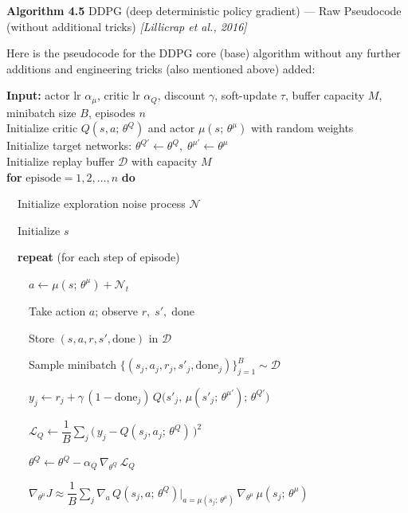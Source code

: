 \documentclass[11pt]{article}
\begin{document}
    \label{pseudo-4-5}

    \begin{pseudobox}

\textbf{Algorithm 4.5} DDPG (deep deterministic policy gradient) --- Raw
Pseudocode (without additional tricks) \emph{{[}Lillicrap et al.,
2016{]}}

\tcbline

Here is the pseudocode for the DDPG core (base) algorithm without any
further additions and engineering tricks (also mentioned above) added:

\textbf{Input:} actor lr \(\alpha_\mu\), critic lr \(\alpha_Q\),
discount \(\gamma\), soft-update \(\tau\), buffer capacity \(M\),
minibatch size \(B\), episodes \(n\)\\
Initialize critic \(Q(s, a;\, \theta^{Q})\) and actor
\(\mu(s;\, \theta^{\mu})\) with random weights\\
Initialize target networks:
\(\theta^{Q'} \leftarrow \theta^{Q},\;\theta^{\mu'} \leftarrow \theta^{\mu}\)\\
Initialize replay buffer \(\mathcal{D}\) with capacity \(M\)\\
\textbf{for} \(\text{episode} = 1, 2, \ldots, n\) \textbf{do}\\
\strut ~~Initialize exploration noise process \(\mathcal{N}\)\\
\strut ~~Initialize \(s\)\\
\strut ~~\textbf{repeat} (for each step of episode)\\
\strut ~~~~\(a \leftarrow \mu(s;\, \theta^{\mu}) + \mathcal{N}_t\)\\
\strut ~~~~Take action \(a\); observe \(r,\; s',\; \text{done}\)\\
\strut ~~~~Store \((s, a, r, s', \text{done})\) in \(\mathcal{D}\)\\
\strut ~~~~Sample minibatch
\(\{(s_j, a_j, r_j, s'_j, \text{done}_j)\}_{j=1}^{B} \sim \mathcal{D}\)\\
\strut ~~~~\(y_j \leftarrow r_j + \gamma\,(1 - \text{done}_j)\, Q\bigl(s'_j,\, \mu(s'_j;\, \theta^{\mu'});\, \theta^{Q'}\bigr)\)\\
\strut ~~~~\(\mathcal{L}_Q \leftarrow \dfrac{1}{B} \sum_j \bigl(\, y_j - Q(s_j, a_j;\, \theta^{Q}) \,\bigr)^{2}\)\\
\strut ~~~~\(\theta^{Q} \leftarrow \theta^{Q} - \alpha_Q\, \nabla_{\theta^{Q}}\, \mathcal{L}_Q\)\\
\strut ~~~~\(\nabla_{\theta^{\mu}} J \approx \dfrac{1}{B} \sum_j \nabla_a\, Q(s_j, a;\, \theta^{Q})\bigr|_{a = \mu(s_j;\, \theta^{\mu})}\, \nabla_{\theta^{\mu}}\, \mu(s_j;\, \theta^{\mu})\)\\

\end{pseudobox}
\end{document}
